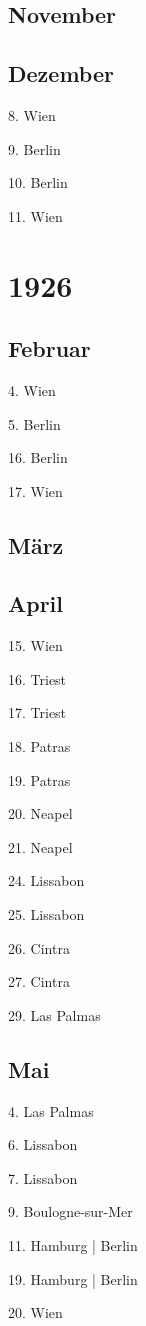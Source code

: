\documentclass[twoside=false,titlepage=false,open=any, parskip=never, fontsize=10pt, headings=small, chapterprefix=false, appendixprefix=false, DIV=15]{scrbook}
\begin{document}
\begin{multicols}{3}
            \section*{November}
            \section*{Dezember}
            8. Wien\par
            9. Berlin\par
            10. Berlin\par
            11. Wien\par
            \chapter*{1926}
            \section*{Februar}
            4. Wien\par
            5. Berlin\par
            16. Berlin\par
            17. Wien\par
            \section*{März}
            \section*{April}
            15. Wien\par
            16. Triest\par
            17. Triest\par
            18. Patras\par
            19. Patras\par
            20. Neapel\par
            21. Neapel\par
            24. Lissabon\par
            25. Lissabon\par
            26. Cintra\par
            27. Cintra\par
            29. Las Palmas\par
            \section*{Mai}
            4. Las Palmas\par
            6. Lissabon\par
            7. Lissabon\par
            9. Boulogne-sur-Mer\par
            11. Hamburg | Berlin\par
            19. Hamburg | Berlin\par
            20. Wien\par

\end{multicols}
\end{document}
